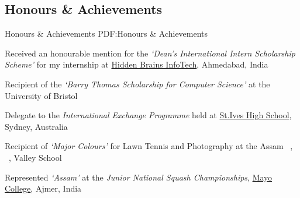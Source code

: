 \documentclass[a4paper,10pt,oneside]{article}
\begin{document}
\begin{body}
\section
{Honours \newline \& \newline Achievements}
{Honours \& Achievements}
{PDF:Honours \& Achievements}
\begin{itemslist}
\item
Received an honourable mention for the \textit{`Dean's International Intern Scholarship Scheme'} \hfill {} \newline
for my internship at
\href{http://www.hiddenbrains.com/}
{Hidden Brains InfoTech},
Ahmedabad, India
\item
Recipient of the \textit{`Barry Thomas Scholarship for Computer Science'} at the University \hfill {} \newline
of Bristol
\item
Delegate to the \textit{International Exchange Programme} held at \href{http://www.stives-h.schools.nsw.edu.au/}{St.Ives High School}, \hfill {} \newline
Sydney, Australia
\item
Recipient of \textit{`Major Colours'} for Lawn Tennis and Photography at the Assam \hfill {}\ , {}\ , {} \newline Valley School
\item
Represented \textit{`Assam'} at the \textit{Junior National Squash Championships}, \href{https://www.mayocollege.com/}{Mayo College}, Ajmer, India \hfill {}
\end{itemslist}
\vspace{-5pt}
\hline





\end{body}
\end{document}
